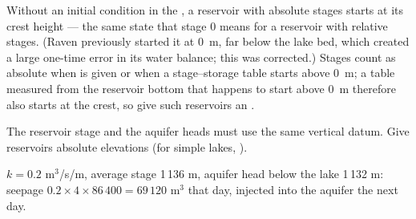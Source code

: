 Without an initial condition in the , a reservoir with absolute stages starts at its crest height --- the same state
that stage 0 means for a reservoir with relative stages. (Raven previously started it at 0~m, far below the lake bed,
which created a large one-time error in its water balance; this was corrected.) Stages count as absolute when
 is given or when a stage--storage table starts above 0~m; a table measured from the
reservoir bottom that happens to start above 0~m therefore also starts at the crest, so give such reservoirs an
.
\begin{watch}
The reservoir stage and the aquifer heads must use the same vertical datum. Give reservoirs absolute elevations (for
simple lakes, ).
\end{watch}
\begin{example}
$k=0.2$ m$^3$/s/m, average stage 1\,136 m, aquifer head below the lake 1\,132 m: seepage
$0.2\times4\times86\,400=69\,120$ m$^3$ that day, injected into the aquifer the next day.
\end{example}

